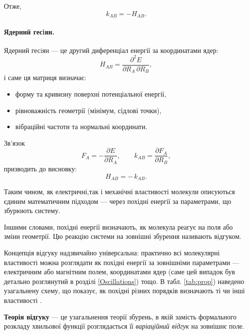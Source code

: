 \documentclass{PySCFBook}
\begin{document}
Отже,
\[
	k_{AB} = -H_{AB}.
\]

\paragraph{Ядерний гесiян.}

Ядерний гесiян --- це другий диференціал енергії за координатами ядер:
\begin{equation}
	H_{AB} =
	\frac{\partial^2 E}{\partial R_A\,\partial R_B},
\end{equation}
і саме ця матриця визначає:

\begin{itemize}
	\item форму та кривизну поверхні потенціальної енергії,
	\item рівноважність геометрії (мінімум, сідлові точки),
	\item вібраційні частоти та нормальні координати.
\end{itemize}

Зв’язок
\[
	F_A = -\frac{\partial E}{\partial R_A}, \qquad
	k_{AB} = \frac{\partial F_A}{\partial R_B},
\]
призводить до висновку:
\[
	H_{AB} = -\,k_{AB}.
\]

Таким чином, як електричні,так і механічні властивості молекули
описуються єдиним математичним підходом --- через похідні енергії за параметрами, що збурюють систему.

Іншими словами, похідні енергії визначають, як молекула реагує на поля або зміни геометрії. Цю  реакцію системи на зовнішні збурення називають відгуком.

Концепція відгуку надзвичайно універсальна: практично всі молекулярні властивості можна розглядати як похідні енергії за зовнішніми параметрами --- електричним або магнітним полем, координатами ядер (саме цей випадок був детально розглянутий в розділі \ref{Oscillations}) тощо.
В табл. \ref{tab:prop}) наведено узагальнену схему, що показує, як похідні різних порядків визначають ті чи інші властивості .

\begin{commentbox}
\textbf{Теорія відгуку} --- це узагальнення теорії збурень, в якій
замість формального розкладу хвильової функції розглядається її \emph{варіаційний відгук} на зовнішнє поле.
\end{commentbox}
\end{document}
